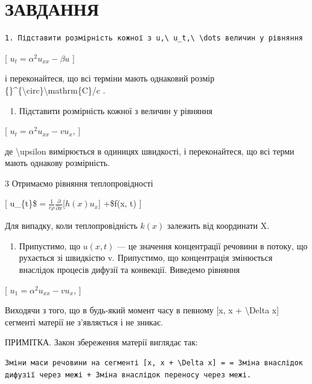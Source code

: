 \documentclass[
]{article}
\providecommand{\tightlist}{%
  \setlength{\itemsep}{0pt}\setlength{\parskip}{0pt}}
\begin{document}
\section{ЗАВДАННЯ}\label{ux437ux430ux432ux434ux430ux43dux43dux44f-2}

\begin{verbatim}
1. Підставити розмірність кожної з u,\ u_t,\ \dots величин у рівняння
\end{verbatim}

{[} \(u_t = \alpha^2 u_{xx} - \beta u\) {]}

і переконайтеся, що всі терміни мають однаковий розмір
\{\}\^{}\{\textbackslash circ\}\textbackslash mathrm\{C\}/c .

\begin{enumerate}
\def\labelenumi{\arabic{enumi}.}
\setcounter{enumi}{1}
\tightlist
\item
  Підставити розмірність кожної з величин у рівняння
\end{enumerate}

{[} \(u_t = \alpha^2 u_{xx} - v u_x\), {]}

де \textbackslash upsilon вимірюється в одиницях швидкості, і
переконайтеся, що всі терми мають однакову розмірність.

3 Отримаємо рівняння теплопровідності

{[}
u\_\{t\}\$\(= \frac{1}{c\rho} \frac{\partial}{\partial x}\){[}\(h(x)u_{x}\){]}
+\$f(x, t) {]}

Для випадку, коли теплопровідність \(k\left( x\right)\) залежить від
координати X.

\begin{enumerate}
\def\labelenumi{\arabic{enumi}.}
\setcounter{enumi}{3}
\tightlist
\item
  Припустимо, що \(u(x, t)\) --- це значення концентрації речовини в
  потоку, що рухається зі швидкістю v. Припустимо, що концентрація
  змінюється внаслідок процесів дифузії та конвекції. Виведемо рівняння
\end{enumerate}

{[} \(u_1 = \alpha^2 u_{xx} - v u_x\), {]}

Виходячи з того, що в будь-який момент часу в певному {[}x, x +
\textbackslash Delta x{]} сегменті матерії не з'являється і не зникає.

ПРИМІТКА. Закон збереження матерії виглядає так:

\begin{verbatim}
Зміни маси речовини на сегменті [x, x + \Delta x] = = Зміна внаслідок дифузії через межі + Зміна внаслідок переносу через межі.
\end{verbatim}
\end{document}
